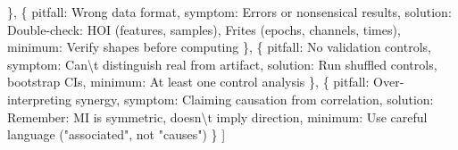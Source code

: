 \documentclass[
  11pt,
  letterpaper,
  oneside,
  openany]{book}
\newenvironment{Shaded}{\begin{snugshade}}{\end{snugshade}}
\newcommand{\CharTok}[1]{\textcolor[rgb]{0.13,0.47,0.30}{#1}}
\newcommand{\NormalTok}[1]{\textcolor[rgb]{0.00,0.23,0.31}{#1}}
\newcommand{\StringTok}[1]{\textcolor[rgb]{0.13,0.47,0.30}{#1}}
\begin{document}
\begin{Shaded}
\begin{Highlighting}[]
\NormalTok{    \},}
\NormalTok{    \{}
        \StringTok{\textquotesingle{}pitfall\textquotesingle{}}\NormalTok{: }\StringTok{\textquotesingle{}Wrong data format\textquotesingle{}}\NormalTok{,}
        \StringTok{\textquotesingle{}symptom\textquotesingle{}}\NormalTok{: }\StringTok{\textquotesingle{}Errors or nonsensical results\textquotesingle{}}\NormalTok{,}
        \StringTok{\textquotesingle{}solution\textquotesingle{}}\NormalTok{: }\StringTok{\textquotesingle{}Double{-}check: HOI (features, samples), Frites (epochs, channels, times)\textquotesingle{}}\NormalTok{,}
        \StringTok{\textquotesingle{}minimum\textquotesingle{}}\NormalTok{: }\StringTok{\textquotesingle{}Verify shapes before computing\textquotesingle{}}
\NormalTok{    \},}
\NormalTok{    \{}
        \StringTok{\textquotesingle{}pitfall\textquotesingle{}}\NormalTok{: }\StringTok{\textquotesingle{}No validation controls\textquotesingle{}}\NormalTok{,}
        \StringTok{\textquotesingle{}symptom\textquotesingle{}}\NormalTok{: }\StringTok{\textquotesingle{}Can}\CharTok{\textbackslash{}\textquotesingle{}}\StringTok{t distinguish real from artifact\textquotesingle{}}\NormalTok{,}
        \StringTok{\textquotesingle{}solution\textquotesingle{}}\NormalTok{: }\StringTok{\textquotesingle{}Run shuffled controls, bootstrap CIs\textquotesingle{}}\NormalTok{,}
        \StringTok{\textquotesingle{}minimum\textquotesingle{}}\NormalTok{: }\StringTok{\textquotesingle{}At least one control analysis\textquotesingle{}}
\NormalTok{    \},}
\NormalTok{    \{}
        \StringTok{\textquotesingle{}pitfall\textquotesingle{}}\NormalTok{: }\StringTok{\textquotesingle{}Over{-}interpreting synergy\textquotesingle{}}\NormalTok{,}
        \StringTok{\textquotesingle{}symptom\textquotesingle{}}\NormalTok{: }\StringTok{\textquotesingle{}Claiming causation from correlation\textquotesingle{}}\NormalTok{,}
        \StringTok{\textquotesingle{}solution\textquotesingle{}}\NormalTok{: }\StringTok{\textquotesingle{}Remember: MI is symmetric, doesn}\CharTok{\textbackslash{}\textquotesingle{}}\StringTok{t imply direction\textquotesingle{}}\NormalTok{,}
        \StringTok{\textquotesingle{}minimum\textquotesingle{}}\NormalTok{: }\StringTok{\textquotesingle{}Use careful language ("associated", not "causes")\textquotesingle{}}
\NormalTok{    \}}
\NormalTok{]}


\end{Highlighting}
\end{Shaded}
\end{document}
